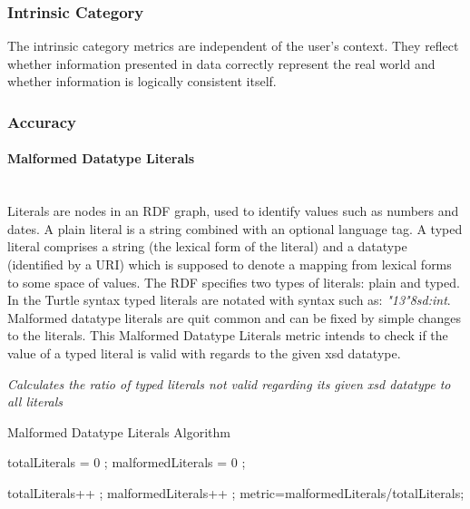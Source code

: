 
\subsubsection{Intrinsic Category}

The intrinsic category metrics are independent of the user's context.
They reflect whether information presented in data correctly represent the real world and whether information is logically consistent itself.
\label{sec:Intrinsic} 


\subsubsection{Accuracy} %

\paragraph{Malformed Datatype Literals} ~\\ %

Literals are nodes in an RDF graph, used to identify values such as numbers and dates.
A plain literal is a string combined with an optional language tag.
A typed literal comprises a string (the lexical form of the literal) and a datatype (identified by a URI) which is supposed to denote a mapping from lexical forms to some space of values.
The RDF specifies two types of literals: plain and typed. 
In the Turtle syntax typed literals are notated with syntax such as:  \textit{"13"^^xsd:int}.
Malformed datatype literals are quit common and can be fixed by simple changes to the literals.
This Malformed Datatype Literals metric intends to check if the value of a typed literal is valid with regards to the given xsd datatype.

\begin{mdframed}[style=metricdefinition]
\emph{Calculates the ratio of typed literals not valid regarding its given xsd datatype to all literals}
\end{mdframed}



\begin{algorithm}
\caption{Malformed Datatype Literals Algorithm}\label{lst:deref}
\begin{algorithmic}[1]
\State totalLiterals = 0 ;
\State malformedLiterals = 0 ;
\EndProcedure

 totalLiterals++ ;
 malformedLiterals++ ; \EndIf
 \EndIf
\State metric=malformedLiterals/totalLiterals;
\EndProcedure
\end{algorithmic}
\end{algorithm}


